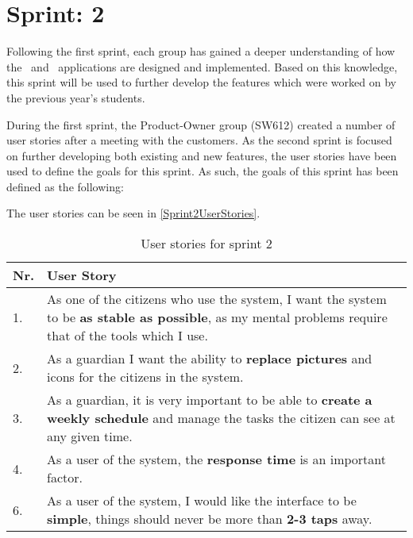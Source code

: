 \chapter{Sprint: 2}
Following the first sprint, each group has gained a deeper understanding of how
the \lapp\ and \wapp\ applications are designed and implemented. Based on this
knowledge, this sprint will be used to further develop the features which were
worked on by the previous year's students.\nl

During the first sprint, the Product-Owner group (SW612) created a number of
user stories after a meeting with the customers. As the second sprint is focused
on further developing both existing and new features, the user stories have been
used to define the goals for this sprint. As such, the goals of this sprint has
been defined as the following:\nl

\nl

\nl

The user stories can be seen in \autoref{Sprint2UserStories}.

\begin{table}[H]
\centering 
\begin{tabular}{|l|p{12.5cm}|}
\hline
Nr. & User Story \\\hline
1. & As one of the citizens who use the system, I want the system to be 
\textbf{as stable as possible}, as my mental problems require that of the tools
which I use. \\ \hline
2. & As a guardian I want the ability to \textbf{replace pictures} and icons
for the citizens in the system.\\ \hline
3. & As a guardian, it is very important to be able to \textbf{create a weekly
schedule} and manage the tasks the citizen can see at any given time.\\ \hline
4. & As a user of the system, the \textbf{response time} is an important
factor.\\ \hline
6. & As a user of the system, I would like the interface to be \textbf{simple},
things should never be more than \textbf{2-3 taps} away. \\\hline
\end{tabular}
\caption{User stories for sprint 2}
\label{Sprint2UserStories}
\end{table}

